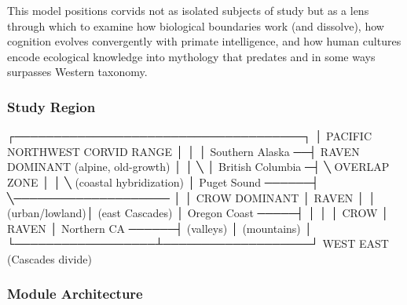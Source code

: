 \documentclass[11pt,letterpaper]{article}
\begin{document}
This model positions corvids not as isolated subjects of study but as a lens through which to examine how biological boundaries work (and dissolve), how cognition evolves convergently with primate intelligence, and how human cultures encode ecological knowledge into mythology that predates and in some ways surpasses Western taxonomy.

\subsubsection{Study Region}

\begin{asciibox}
                    ┌─────────────────────────────────────┐
                    │     PACIFIC NORTHWEST CORVID RANGE   │
                    │                                      │
  Southern Alaska ──┤  RAVEN DOMINANT (alpine, old-growth) │
                    │    ╲                                 │
  British Columbia ─┤     ╲  OVERLAP ZONE                 │
                    │      ╲  (coastal hybridization)     │
  Puget Sound ──────┤       ╲────────────────────         │
                    │   CROW DOMINANT  │ RAVEN             │
                    │   (urban/lowland)│ (east Cascades)   │
  Oregon Coast ─────┤                  │                   │
                    │   CROW           │ RAVEN             │
  Northern CA ──────┤   (valleys)      │ (mountains)       │
                    └──────────────────┴───────────────────┘
                          WEST              EAST
                       (Cascades divide)
\end{asciibox}

\subsubsection{Module Architecture}
\end{document}
